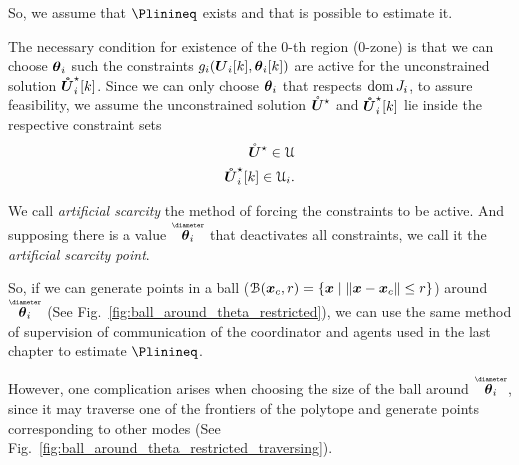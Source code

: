 \documentclass[../main.tex]{subfiles}
\begin{document}
So, we assume that $\Plinineq$ exists and that is possible to estimate it.

The necessary condition for existence of the $0$-th region ($0$-zone) is that we can choose $\boldsymbol{\theta}_{i}$ such the constraints $\inequalityfunction$ are active for the unconstrained solution $\optuncUik$.
Since we can only choose $\boldsymbol{\theta}_{i}$ that respects $\operatorname{dom} J_{i}$, to assure feasibility, we assume the unconstrained solution ${\mathring{\boldsymbol{U}}^{\star}}$ and $\optuncUik$ lie inside
the respective constraint sets
\begin{align}
  \optuncU\in\set{U}\\
  \optuncUik\in\set{U}_{i}.
\end{align}


We call \emph{artificial scarcity} the method of forcing the constraints to be active.
And supposing there is a value $\thetairestricted$ that deactivates all constraints, we call it the \emph{artificial scarcity point}.

So, if we can generate points in a ball ($\mathcal{B}(\boldsymbol{x}_{c},r)=\{\boldsymbol{x}\mid\left\lVert\boldsymbol{x}-\boldsymbol{x}_{c}\right\rVert\leq r\}$) around $\thetairestricted$ (See Fig.~\ref{fig:ball_around_theta_restricted}), we can use the same method of supervision of communication of the coordinator and agents used in the last chapter to estimate $\Plinineq$.

However, one complication arises when choosing the size of the ball around $\thetairestricted$, since it may traverse one of the frontiers of the polytope and generate points corresponding to other modes (See Fig.~\ref{fig:ball_around_theta_restricted_traversing}).
\end{document}
